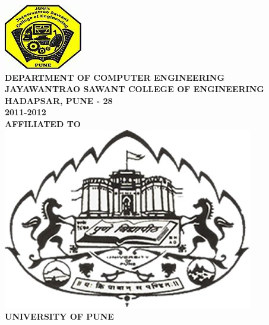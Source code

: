 \begin{center}
\includegraphics[scale=0.5]{project/images/jscoe_logo}\\
\large{\textbf{DEPARTMENT OF COMPUTER ENGINEERING}}\\
\Large{\textbf{JAYAWANTRAO SAWANT COLLEGE OF ENGINEERING}}\\
\large{\textbf{HADAPSAR, PUNE - 28}}
\large{\textbf{\\2011-2012}}\\[0.5cm]
\Large{\textbf{AFFILIATED TO}}\\[0.5cm]
\includegraphics[scale=5.0]{project/images/uop-logo}\\
\LARGE{\textbf{UNIVERSITY OF PUNE}}
\newpage

\end{center}